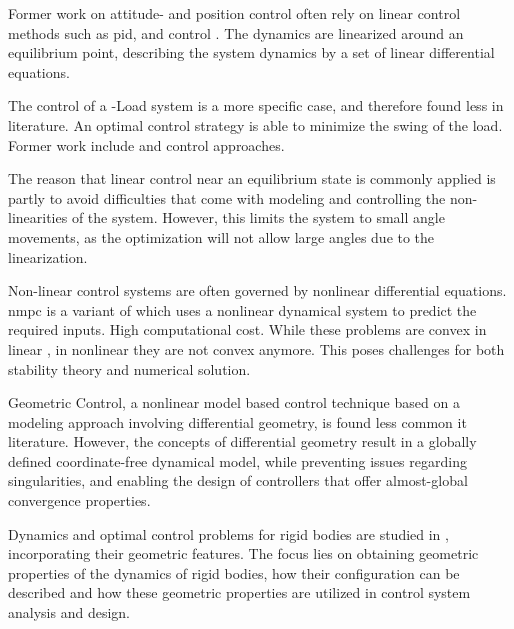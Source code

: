 Former work on  attitude- and position control often rely on linear control methods such as \acs{pid}\cite{bibid},  \cite{Bangura2014} and  control \cite{bibid}. The dynamics are linearized around an equilibrium point, describing the system dynamics by a set of linear differential equations. 

The control of a -Load system is a more specific case, and therefore found less in literature. 
An optimal control strategy is able to minimize the swing of the load. Former work include  \cite{PraveenThesis} and \cite{bibid} control approaches. 


The reason that linear control near an equilibrium state is commonly applied is partly to avoid difficulties that come with modeling and controlling the non-linearities of the system. However, this limits the system to small angle movements, as the optimization will not allow large angles due to the linearization.
 
Non-linear control systems are often governed by nonlinear differential equations. 
\acs{nmpc} is a variant of  which uses a nonlinear dynamical system to predict the required inputs.
High computational cost.
While these problems are convex in linear , in nonlinear  they are not convex anymore. This poses challenges for both  stability theory and numerical solution.

Geometric Control, a nonlinear model based control technique based on a modeling approach involving differential geometry, is found less common it literature. However, the concepts of differential geometry result in a globally defined coordinate-free dynamical model, while preventing issues regarding singularities, and enabling the design of controllers that offer almost-global convergence properties.

Dynamics and optimal control problems for rigid bodies are studied in \cite{Lee2008}, incorporating their geometric features. The focus lies on obtaining geometric properties of the dynamics of rigid bodies, how their configuration can be described and how these geometric properties are utilized in control system analysis and design. 

